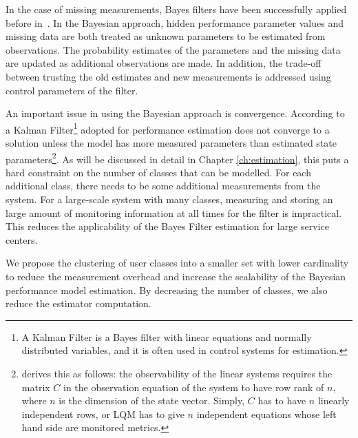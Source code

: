 In the case of missing measurements, Bayes filters have been successfully applied before in~\cite{woodside_use_2005,xu_performance_2005,zheng_tracking_2005}. In the Bayesian approach, hidden performance parameter values and missing data are both treated as unknown parameters to be estimated from observations. The probability estimates of the parameters and the missing data are updated as additional observations are made. In addition, the trade-off between trusting the old estimates and new measurements is addressed using control parameters of the filter. 

An important issue in using the Bayesian approach is convergence. 
According to \cite{zheng_performance_2008} a Kalman Filter\cite{watson_kalman_1983}\footnote{A Kalman Filter is a Bayes filter with linear equations and normally distributed variables, and it is often used in control systems for estimation.} adopted for performance estimation does not converge to a solution unless the model has more measured parameters than estimated state parameters\footnote{\cite{zheng_performance_2008} derives this as follows: the observability of the linear systems requires the matrix $C$ in the observation equation of the system to have row rank of $n$, where $n$ is the dimension of the state vector. Simply, $C$ has to have $n$ linearly independent rows, or LQM has to give $n$ independent equations whose left hand side are monitored metrics.}. 
As will be discussed in detail in Chapter \ref{ch:estimation}, this puts a hard constraint on the number of classes that can be modelled. 
For each additional class, there needs to be some additional measurements from the system. 
For a large-scale system with many classes, measuring and storing an large amount of monitoring information at all times for the filter is impractical.
This reduces the applicability of the Bayes Filter estimation for large service centers.

We propose the clustering of user classes into a smaller set with lower cardinality to reduce the measurement overhead and
increase the scalability of the Bayesian performance model estimation. 
By decreasing the number of classes, we also reduce the estimator computation.


